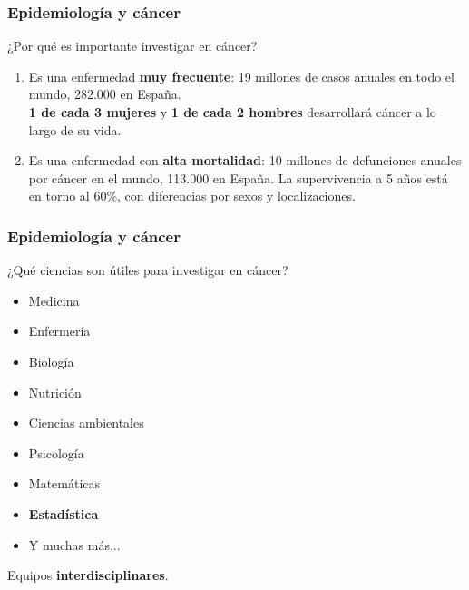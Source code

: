 \documentclass{beamer}
\begin{document}


\begin{frame}\frametitle{Epidemiología y cáncer}
	\begin{block}{¿Por qué es importante investigar en cáncer?}
		\begin{enumerate}
			\item Es una enfermedad \textbf{muy frecuente}: 19 millones de casos anuales en todo el mundo, 282.000 en España.\\ \Large{\textbf{1 de cada 3 mujeres} y \textbf{1 de cada 2 hombres} desarrollará cáncer a lo largo de su vida.}\\[2ex]
			\item \normalsize Es una enfermedad con \textbf{alta mortalidad}: 10 millones de defunciones anuales por cáncer en el mundo, 113.000 en España. La supervivencia a 5 años está en torno al 60\%, con diferencias por sexos y localizaciones.\\[2ex]
		\end{enumerate}
	\end{block}
\end{frame}


\begin{frame}\frametitle{Epidemiología y cáncer}
	\begin{block}{¿Qué ciencias son útiles para investigar en cáncer?}
		\begin{itemize}
			\item Medicina
			\item Enfermería
			\item Biología
			\item Nutrición
			\item Ciencias ambientales
			\item Psicología
			\item Matemáticas
			\item \textbf{\large{Estadística}}
			\item Y muchas más...
		\end{itemize}
		Equipos \textbf{interdisciplinares}.
	\end{block}
\end{frame}

\end{document}
